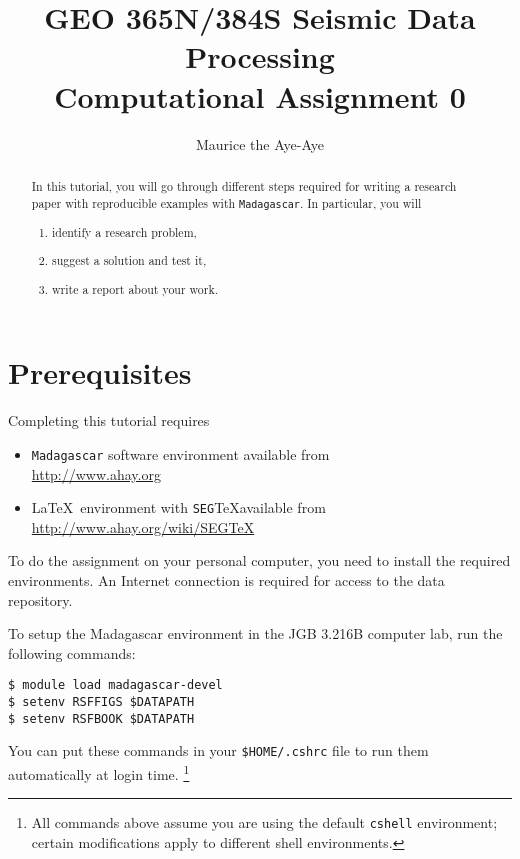 \author{Maurice the Aye-Aye}
\title{GEO 365N/384S Seismic Data Processing \\ Computational Assignment 0}

\maketitle

\begin{abstract}
  In this tutorial, you will go through different steps required for writing a research paper with reproducible examples with \texttt{Madagascar}. In particular, you will
  \begin{enumerate}
    \item identify a research problem,
    \item suggest a solution and test it,
    \item write  a report about your work.
  \end{enumerate}
\end{abstract}

\section{Prerequisites}

Completing this tutorial requires
\begin{itemize}
\item \texttt{Madagascar} software environment available from \\
\url{http://www.ahay.org}
\item \LaTeX\ environment with \texttt{SEG}\TeX available from \\ 
\url{http://www.ahay.org/wiki/SEGTeX}
\end{itemize}
To do the assignment on your personal computer, you need to install
the required environments. An Internet connection is required for
access to the data repository.

To setup the Madagascar environment in the JGB 3.216B computer lab, run the following commands:
\begin{verbatim}
$ module load madagascar-devel
$ setenv RSFFIGS $DATAPATH
$ setenv RSFBOOK $DATAPATH
\end{verbatim}
You can put these commands in your \verb+$HOME/.cshrc+ file to run them automatically at login time. \footnote{All commands above assume you are using the default \texttt{cshell} environment; certain modifications apply to different shell environments.}

